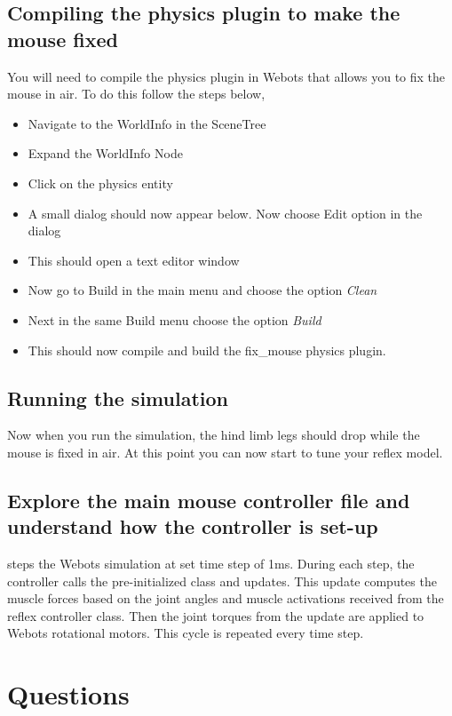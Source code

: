 \documentclass{cmc}
\begin{document}
\subsection*{Compiling the physics plugin to make the mouse fixed}

You will need to compile the physics plugin in Webots that allows you
to fix the mouse in air. To do this follow the steps below,

\begin{itemize}
\item Navigate to the WorldInfo in the SceneTree
\item Expand the WorldInfo Node
\item Click on the physics entity
\item A small dialog should now appear below. Now choose Edit option
  in the dialog
\item This should open a text editor window
\item Now go to Build in the main menu and choose the option
  \textit{Clean}
\item Next in the same Build menu choose the option \textit{Build}
\item This should now compile and build the fix\_mouse physics plugin.
\end{itemize}

\subsection*{Running the simulation}
Now when you run the simulation, the hind limb legs should drop while
the mouse is fixed in air. At this point you can now start to tune
your reflex model.

\subsection*{Explore the main mouse controller file
   and understand how the controller is set-up}
 steps the Webots simulation at set time step of
1ms. During each step, the controller calls the pre-initialized
 class and
updates. This update computes the muscle forces based on the joint
angles and muscle activations received from the reflex controller
class.  Then the joint torques from the update are applied to Webots
rotational motors. This cycle is repeated every time step.

\section*{Questions}
\end{document}
